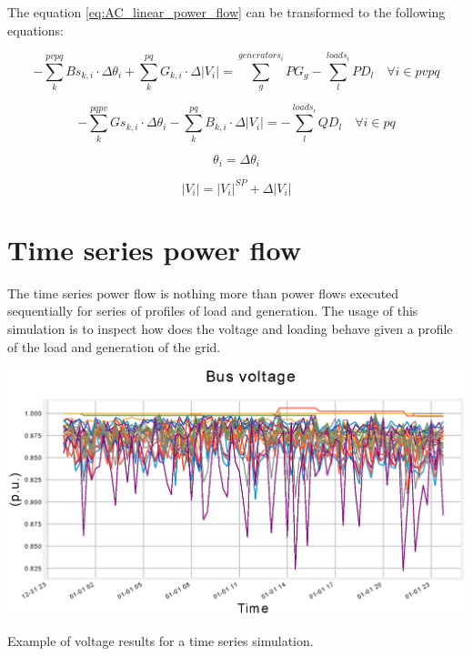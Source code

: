 \documentclass[nols,a4paper,twoside,notoc,fleqn]{tufte-book}
\begin{document}
The equation \ref{eq:AC_linear_power_flow} can be transformed to the following equations:

\begin{equation}
-\sum_{k}^{pvpq}Bs_{k,i} \cdot \Delta\theta_i + \sum_{k}^{pq}G_{k,i} \cdot \Delta|V_i| = \sum_{g}^{generators_i} PG_{g} - \sum_{l}^{loads_i} PD_l \quad \forall i \in pvpq
\end{equation}

\begin{equation}
-\sum_{k}^{pqpv}Gs_{k,i} \cdot \Delta\theta_i - \sum_{k}^{pq}B_{k,i} \cdot \Delta|V_i| = - \sum_{l}^{loads_i} QD_l \quad \forall i \in pq
\end{equation}

\begin{equation}
\theta_i = \Delta \theta_i
\end{equation}

\begin{equation}
|V_i| = |V_i|^{SP} + \Delta |V_i|
\end{equation}

\chapter{Time series power flow}

The time series power flow is nothing more than power flows executed sequentially for series of profiles of load and generation. The usage of this simulation is to inspect how does the voltage and loading behave given a profile of the load and generation of the grid.

\begin{marginfigure}
	\includegraphics[width=\linewidth]{img/Time_series.eps}
	\caption{Example of voltage results for a time series simulation.}
	\label{fig:time_series}
\end{marginfigure}
\end{document}
